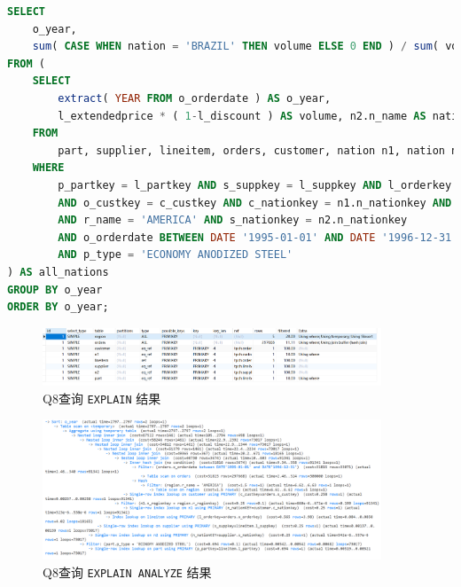 \documentclass{article}
\renewcommand\tt{\texttt}
\begin{document}
\begin{enumerate}
\begin{lstlisting}[language=sql]
SELECT
	o_year,
	sum( CASE WHEN nation = 'BRAZIL' THEN volume ELSE 0 END ) / sum( volume ) AS mkt_share 
FROM (
	SELECT
		extract( YEAR FROM o_orderdate ) AS o_year,
		l_extendedprice * ( 1-l_discount ) AS volume, n2.n_name AS nation 
	FROM
		part, supplier, lineitem, orders, customer, nation n1, nation n2, region 
	WHERE
		p_partkey = l_partkey AND s_suppkey = l_suppkey AND l_orderkey = o_orderkey 
		AND o_custkey = c_custkey AND c_nationkey = n1.n_nationkey AND n1.n_regionkey = r_regionkey 
		AND r_name = 'AMERICA' AND s_nationkey = n2.n_nationkey 
		AND o_orderdate BETWEEN DATE '1995-01-01' AND DATE '1996-12-31' 
		AND p_type = 'ECONOMY ANODIZED STEEL' 
) AS all_nations 
GROUP BY o_year 
ORDER BY o_year;
\end{lstlisting}

\begin{figure}[H]
\centering
\includegraphics[width=0.9\textwidth]{img/15.png}
\caption{Q8查询 \tt{EXPLAIN} 结果}
\end{figure}

\begin{figure}[H]
\centering
\includegraphics[width=0.9\textwidth]{img/16.png}
\caption{Q8查询 \tt{EXPLAIN ANALYZE} 结果}
\end{figure}


\end{enumerate}
\end{document}

